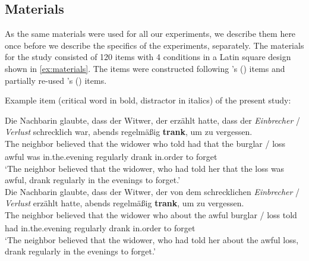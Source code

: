 \documentclass[a4paper, man, floatsintext]{apa7}
\begin{document}
\subsection{Materials}
As the same materials were used for all our experiments, we describe them here once before we describe the specifics of the experiments, separately. The materials for the study consisted of 120 items with 4 conditions in a Latin square design shown in \ref{ex:materials}. The items were constructed following \citeauthor{vandyke07}'s (\citeyear{vandyke07}) items and partially re-used  \citeauthor{mertzen}'s (\citeyear{mertzen}) items.

\begin{exe}  
\ex \label{ex:materials} Example item (critical word in bold, distractor in italics) of the present study:
    \begin{xlist}   
    \label{ex:hisyn} 
    \gll Die  Nachbarin glaubte,	dass	der Witwer,  der  erzählt hatte, dass der \textit{Einbrecher} / \textit{Verlust}  schrecklich war, abends regelmäßig \textbf{trank}, um zu vergessen.\\ 
    The\textsubscript{} neighbor\textsubscript{} believed that the widower who told had that the burglar / loss awful was in.the.evening regularly drank in.order to forget \\
    \trans `The neighbor believed that the widower, who had told her that the loss was awful, drank regularly in the evenings to forget.' \\
    
    \label{ex:losyn} 
    \gll Die  Nachbarin glaubte, dass der Witwer,  der  von    dem schrecklichen \textit{Einbrecher} / \textit{Verlust} erzählt hatte, abends regelmäßig \textbf{trank}, um zu vergessen. \\ 
    The\textsubscript{} neighbor\textsubscript{} believed that the widower who about the awful burglar / loss told had in.the.evening regularly drank in.order to forget\\
    \trans `The neighbor believed that the widower, who had told her about the awful loss, drank regularly in the evenings to forget.'  \\
    \end{xlist}
\end{exe}
\end{document}
